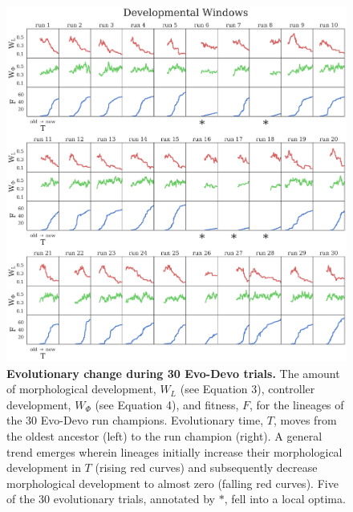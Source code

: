 

\begin{figure}
\centering
\includegraphics[width=\linewidth]{Chapter04/FigS1}
\caption{\label{fig:S1}\textbf{Evolutionary change during 30 Evo-Devo trials.} The amount of morphological development, $W_L$ (see Equation 3), controller development, $W_{\Phi}$ (see Equation 4), and fitness, $F$, for the lineages of the 30 Evo-Devo run champions. Evolutionary time, $T$, moves from the oldest ancestor (left) to the run champion (right). A general trend emerges wherein lineages initially increase their morphological development in $T$ (rising red curves) and subsequently decrease morphological development to almost zero (falling red curves). Five of the 30 evolutionary trials, annotated by {\Large $\ast$}, fell into a local optima.}
\end{figure}



